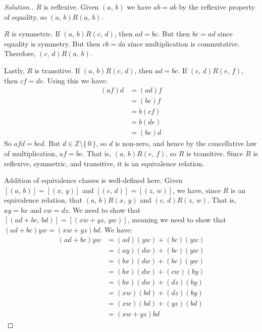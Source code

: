 \documentclass{article}
\theoremstyle{normal}
\begin{document}
    \color{black}
    \begin{proof}[Solution.]
        $R$ is reflexive. Given $(a,\,b)$ we have $ab=ab$ by the reflexive
        property of equality, so $(a,\,b)R(a,\,b)$.
        \par\hfill\par
        $R$ is symmetric. If $(a,\,b)R(c,\,d)$, then $ad=bc$. But then
        $bc=ad$ since equality is symmetry. But then
        $cb=da$ since multiplication is commutative. Therefore,
        $(c,\,d)R(a,\,b)$.
        \par\hfill\par
        Lastly, $R$ is transitive. If $(a,\,b)R(c,\,d)$, then
        $ad=bc$. If $(c,\,d)R(e,\,f)$, then $cf=de$. Using this we have:
        \begin{align}
            (af)d
            &=(ad)f\tag{Associativity}\\
            &=(bc)f\tag{Substitution}\\
            &=b(cf)\tag{Associativity}\\
            &=b(de)\tag{Substitution}\\
            &=(be)d\tag{Associativity and Commutativity}
        \end{align}
        So $afd=bed$. But $d\in\mathbb{Z}\setminus\{\,0\,\}$, so $d$ is
        non-zero, and hence by the cancellative law of multiplication,
        $af=be$. That is, $(a,\,b)R(e,\,f)$, so $R$ is transitive. Since
        $R$ is reflexive, symmetric, and transitive, it is an equivalence
        relation.
        \par\hfill\par
        Addition of equivalence classes is well-defined here. Given
        $[(a,\,b)]=[(x,\,y)]$ and $[(c,\,d)]=[(z,\,w)]$, we have, since $R$ is
        an equivalence relation, that $(a,\,b)R(x,\,y)$ and
        $(c,\,d)R(z,\,w)$. That is, $ay=bx$ and $cw=dz$. We need to show that
        $[(ad+bc,\,bd)]=[(xw+yz,\,yw)]$, meaning we need to show that
        $(ad+bc)yw=(xw+yz)bd$. We have:
        \begin{align}
            (ad+bc)yw
            &=(ad)(yw)+(bc)(yw)\tag{Distributivity}\\
            &=(ay)(dw)+(bc)(yw)\tag{Associativity and Commutativity}\\
            &=(bx)(dw)+(bc)(yw)\tag{Substitution}\\
            &=(bx)(dw)+(cw)(by)\tag{Associativity and Commutativity}\\
            &=(bx)(dw)+(dz)(by)\tag{Substitution}\\
            &=(xw)(bd)+(dz)(by)\tag{Associativity and Commutativity}\\
            &=(xw)(bd)+(yz)(bd)\tag{Associativity and Commutativity}\\
            &=(xw+yz)bd\tag{Distributivity}
        \end{align}
    \end{proof}
\end{document}
